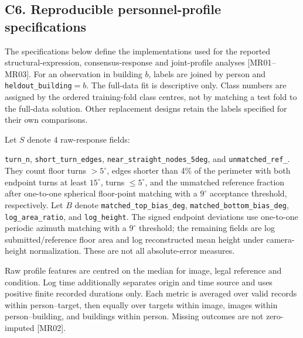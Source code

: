 \clearpage
\subsection*{C6. Reproducible personnel-profile specifications}
The specifications below define the implementations used for the reported
structural-expression, consensus-response and joint-profile analyses
[MR01--MR03]. For an observation in building
$b$, labels are joined by person and \texttt{heldout\_building}$=b$.
The full-data fit is descriptive only. Class numbers are assigned by the
ordered training-fold class centres, not by matching a test fold to the
full-data solution. Other replacement designs retain the labels specified
for their own comparisons.

Let $S$ denote 4 raw-response fields:
\begin{sloppypar}
\texttt{turn\_n}, \texttt{short\_turn\_edges},
\texttt{near\_\allowbreak straight\_\allowbreak nodes\_\allowbreak 5deg},
and \texttt{unmatched\_\allowbreak ref\_}.
They count floor turns $>5^\circ$, edges shorter than 4\% of the perimeter
with both endpoint turns at least $15^\circ$, turns $\leq5^\circ$, and the
unmatched reference fraction after one-to-one spherical floor-point matching
with a $9^\circ$ acceptance threshold, respectively.
Let $B$ denote \texttt{matched\_\allowbreak top\_\allowbreak bias\_\allowbreak deg},
\texttt{matched\_\allowbreak bottom\_\allowbreak bias\_\allowbreak deg}, \texttt{log\_area\_ratio}, and
\texttt{log\_height}. The signed endpoint deviations use one-to-one periodic
azimuth matching with a $9^\circ$ threshold; the remaining fields are log
submitted/reference floor area and log reconstructed mean height under
camera-height normalization. These are not all absolute-error measures.
\end{sloppypar}

Raw profile features are centred on the median for image, legal reference
and condition. Log time additionally separates origin and time source and
uses positive finite recorded durations only. Each metric is averaged over
valid records within person--target, then equally over targets within image,
images within person--building, and buildings within person. Missing
outcomes are not zero-imputed [MR02].

